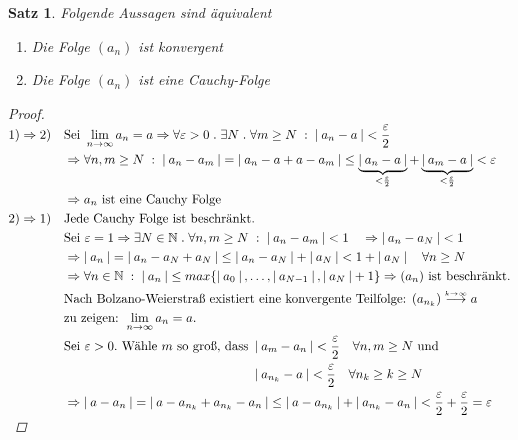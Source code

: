 \documentclass[a4paper,titlepage,oneside]{article}
\def\N{\ensuremath{\mathbb{N}} }
\renewcommand{\epsilon}{\ensuremath{\varepsilon} }
\def\zz{\text{zu zeigen: }}
\def\sp{\hspace{0,1cm}}
\def\spdot{\sp.\sp}
\def\spcolon{\sp:\sp}
\renewcommand{\liminf}[2][n]{\ensuremath{\lim\limits_{#1 \rightarrow \infty}{#2}}}
\newcommand{\abs}[1]{\ensuremath{\left|\:#1\:\right|}}
\newcommand{\longtoinf}[1][n]{\ensuremath{\overset{\scriptscriptstyle{#1 \to \infty}}{\longrightarrow}}}
\theoremstyle{thmstyle}
\newtheorem{satz}{Satz}[section]
\theoremstyle{subthmstyle}
\begin{document}
\begin{satz}
Folgende Aussagen sind äquivalent
\begin{enumerate}
\item Die Folge \((a_n)\) ist konvergent
\item Die Folge \((a_n)\) ist eine Cauchy-Folge
\end{enumerate}
\begin{proof}
\begin{math} \displaystyle
\begin{aligned}[t]
1) \Rightarrow 2) \quad &\text{Sei }\liminf{a_n} = a \Rightarrow \forall \epsilon > 0 \spdot \exists N \spdot \forall m \ge N \spcolon \abs{a_n - a} < \frac{\epsilon}{2} \\
&\Rightarrow \forall n, m \ge N \spcolon \abs{a_n - a_m} = \abs{a_n - a + a - a_m} \le \underbrace{\abs{a_n - a }}_{<\frac{\epsilon}{2}}  + \underbrace{\abs{a_m - a}}_{<\frac{\epsilon}{2}} < \epsilon \\
&\Rightarrow a_n \text{ ist eine Cauchy Folge}\\
2) \Rightarrow 1) \quad &\text{Jede Cauchy Folge ist beschränkt.} \\
& \text{Sei } \epsilon = 1 \Rightarrow \exists N \in \N \spdot \forall n, m \ge N \spcolon \abs{a_n - a_m} < 1 \quad \Rightarrow \abs{a_n - a_N} < 1 \\
&\Rightarrow \abs{a_n} = \abs{a_n - a_N + a_N} \le \abs{a_n - a_N} + \abs{a_N} < 1 + \abs{a_N} \quad \forall n  \ge N\\
&\Rightarrow \forall n \in \N \spcolon \abs{a_n} \le max\{\abs{a_0},\dots,\abs{a_{N-1}},\abs{a_N} + 1\} \Rightarrow (a_n) \text{ ist beschränkt.}\\
&\text{Nach Bolzano-Weierstraß existiert eine konvergente Teilfolge: } (a_{n_k}) \longtoinf[k] a\\
&\zz \liminf{a_n} = a.\\
&\text{Sei }\epsilon > 0. \text{ Wähle $m$ so groß, dass }\begin{aligned}[t]&\abs{a_m - a_n} < \frac{\epsilon}{2} \quad \forall n,m \ge N \text{ und } \\
&\abs{a_{n_k} - a} < \frac{\epsilon}{2} \quad \forall n_k \ge k \ge N \end{aligned} \\
&\Rightarrow \abs{a-a_n} = \abs{a - a_{n_k} + a_{n_k} - a_n} \le \abs{a- a_{n_k}} + \abs{a_{n_k} - a_n} < \frac{\epsilon}{2} + \frac{\epsilon}{2} = \epsilon
\end{aligned}\\
\end{math}
\end{proof}
\end{satz}
\end{document}
